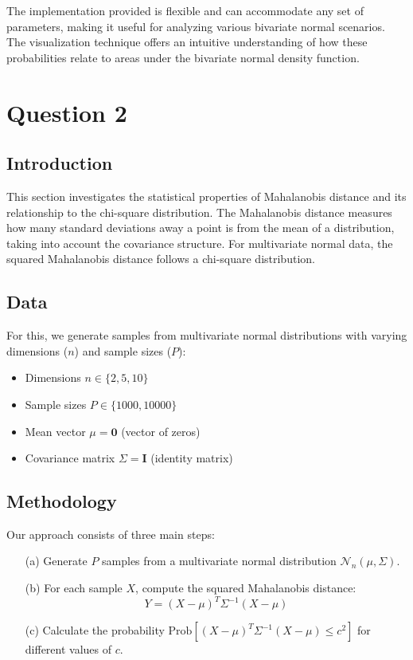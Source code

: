 \documentclass[12pt]{article}
\begin{document}
The implementation provided is flexible and can accommodate any set of parameters, making it useful for analyzing various bivariate normal scenarios. The visualization technique offers an intuitive understanding of how these probabilities relate to areas under the bivariate normal density function.




\section{Question 2}

\subsection{Introduction}
This section investigates the statistical properties of Mahalanobis distance and its relationship to the chi-square distribution. The Mahalanobis distance measures how many standard deviations away a point is from the mean of a distribution, taking into account the covariance structure. For multivariate normal data, the squared Mahalanobis distance follows a chi-square distribution.

\subsection{Data}
For this, we generate samples from multivariate normal distributions with varying dimensions ($n$) and sample sizes ($P$):
\begin{itemize}
    \item Dimensions $n \in \{2, 5, 10\}$
    \item Sample sizes $P \in \{1000, 10000\}$
    \item Mean vector $\mu = \mathbf{0}$ (vector of zeros)
    \item Covariance matrix $\Sigma = \mathbf{I}$ (identity matrix)
\end{itemize}

\subsection{Methodology}
Our approach consists of three main steps:

\begin{enumerate}
    \item[(a)] Generate $P$ samples from a multivariate normal distribution $\mathcal{N}_n(\mu, \Sigma)$.
    \item[(b)] For each sample $X$, compute the squared Mahalanobis distance:
    \begin{equation}
        Y = (X - \mu)^T \Sigma^{-1} (X - \mu)
    \end{equation}
    \item[(c)] Calculate the probability $\text{Prob}[(X - \mu)^T \Sigma^{-1} (X - \mu) \leq c^2]$ for different values of $c$.
\end{enumerate}
\end{document}
